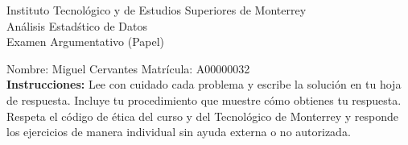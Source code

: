 \documentclass[10pt]{report}
\begin{document}
\newpage



\begin{center}
{\large Instituto Tecnol\'{o}gico y de Estudios Superiores de Monterrey \\
An\'alisis Estad\'stico de Datos } \\
Examen Argumentativo (Papel)
\end{center}

Nombre: \underline{\hspace*{.2in}}
Miguel Cervantes
\underline{\hspace*{.2in}} \quad Matr\'icula:\underline{\hspace*{.2in}}
A00000032
\underline{\hspace*{.2in}} \\

{\bf Instrucciones:} Lee con cuidado cada problema y escribe la soluci\'on
en tu hoja de respuesta. Incluye tu procedimiento que muestre c\'omo obtienes tu respuesta.  Respeta el c\'odigo de \'etica del curso y del Tecnol\'ogico de Monterrey y responde los ejercicios de manera individual sin ayuda externa o no autorizada.
\end{document}
